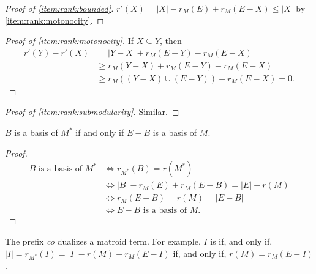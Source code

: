 \begin{proof}[Proof of \ref{item:rank:bounded}]
    \(r'(X) = |X| - r_M(E) + r_M(E - X) \leq |X|\) by \ref{item:rank:motonocity}.
\end{proof}

\begin{proof}[Proof of \ref{item:rank:motonocity}]
    If \(X \subseteq Y\),
    then
    \begin{align*}
        r'(Y) - r'(X)
        &= |Y - X| + r_M(E - Y) - r_M(E - X) \\
        &\geq r_M(Y - X) + r_M(E - Y) - r_M(E - X) \\
        &\geq r_M( (Y - X) \cup (E - Y) ) - r_M( E - X ) = 0.
    \end{align*}
\end{proof}

\begin{proof}[Proof of \ref{item:rank:submodularity}]
    Similar.
\end{proof}

\begin{proposition}
    \(B\) is a basis of \(M^*\) if and only if \(E - B\) is a basis of \(M\).
\end{proposition}

\begin{proof}
    \begin{align*}
        B \text{ is a basis of } M^*
        &\iff r_{M^*}(B) = r(M^*) \\
        &\iff |B| - r_M(E) + r_M(E - B) = |E| - r(M) \\
        &\iff r_M(E - B) = r(M) = |E - B| \\
        &\iff E - B \text{ is a basis of } M.
    \end{align*}
\end{proof}

The prefix \emph{co} dualizes a matroid term.
For example, \(I\) is  if, and only if, \(|I| = r_{M^*}(I) = |I| - r(M) + r_M(E - I)\) if, and only if, \(r(M) = r_M(E - I)\).
